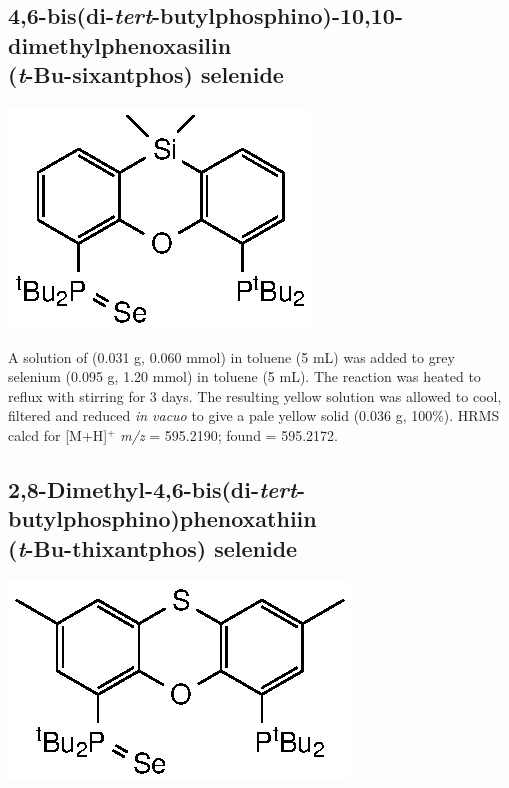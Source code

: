 

\subsection*{4,6-bis(di-\emph{tert}-butylphosphino)-10,10-dimethylphenoxasilin \\(\emph{t}-Bu-sixantphos) selenide}
\begin{structure}[h]
\begin{center}
\includegraphics{../Structures/SitBuSe.eps}
\end{center}
\end{structure}

A solution of \tBuXantphos{} (0.031 g, 0.060 mmol) in toluene (5 mL) was added to grey selenium (0.095 g, 1.20 mmol) in toluene (5 mL).  The reaction was heated to reflux with stirring for 3 days.  The resulting yellow solution was allowed to cool, filtered and reduced \emph{in vacuo} to give a pale yellow solid (0.036 g, 100\%).
HRMS calcd for  [M+H]$^+$ \emph{m/z} = 595.2190; found = 595.2172.


\subsection*{2,8-Dimethyl-4,6-bis(di-\emph{tert}-butylphosphino)phenoxathiin \\(\emph{t}-Bu-thixantphos) selenide}
\begin{structure}[h]
\begin{center}
\includegraphics{../Structures/StBuSe.eps}
\end{center}
\end{structure}

